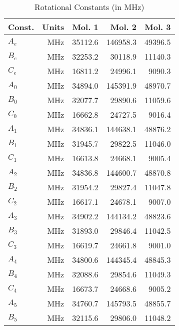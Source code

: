 \begin{table}
\centering
\caption{Rotational Constants (in MHz)}
\begin{tabular}{lrrrr}
Const. &    Units &          Mol. 1 &          Mol. 2 &          Mol. 3 \\
\hline
$A_{e    }$ &      MHz &         35112.6 &        146958.3 &         49396.5 \\
$B_{e    }$ &      MHz &         32253.2 &         30118.9 &         11140.3 \\
$C_{e    }$ &      MHz &         16811.2 &         24996.1 &          9090.3 \\
$A_{0    }$ &      MHz &         34894.0 &        145391.9 &         48970.7 \\
$B_{0    }$ &      MHz &         32077.7 &         29890.6 &         11059.6 \\
$C_{0    }$ &      MHz &         16662.8 &         24727.5 &          9016.4 \\
$A_{1    }$ &      MHz &         34836.1 &        144638.1 &         48876.2 \\
$B_{1    }$ &      MHz &         31945.7 &         29822.5 &         11046.0 \\
$C_{1    }$ &      MHz &         16613.8 &         24668.1 &          9005.4 \\
$A_{2    }$ &      MHz &         34836.8 &        144600.7 &         48870.8 \\
$B_{2    }$ &      MHz &         31954.2 &         29827.4 &         11047.8 \\
$C_{2    }$ &      MHz &         16617.1 &         24678.1 &          9007.0 \\
$A_{3    }$ &      MHz &         34902.2 &        144134.2 &         48823.6 \\
$B_{3    }$ &      MHz &         31893.0 &         29846.4 &         11042.5 \\
$C_{3    }$ &      MHz &         16619.7 &         24661.8 &          9001.0 \\
$A_{4    }$ &      MHz &         34800.6 &        144345.4 &         48845.3 \\
$B_{4    }$ &      MHz &         32088.6 &         29854.6 &         11049.3 \\
$C_{4    }$ &      MHz &         16673.7 &         24668.6 &          9005.2 \\
$A_{5    }$ &      MHz &         34760.7 &        145793.5 &         48855.7 \\
$B_{5    }$ &      MHz &         32115.6 &         29806.0 &         11048.2 \\

\end{tabular}
\end{table}
